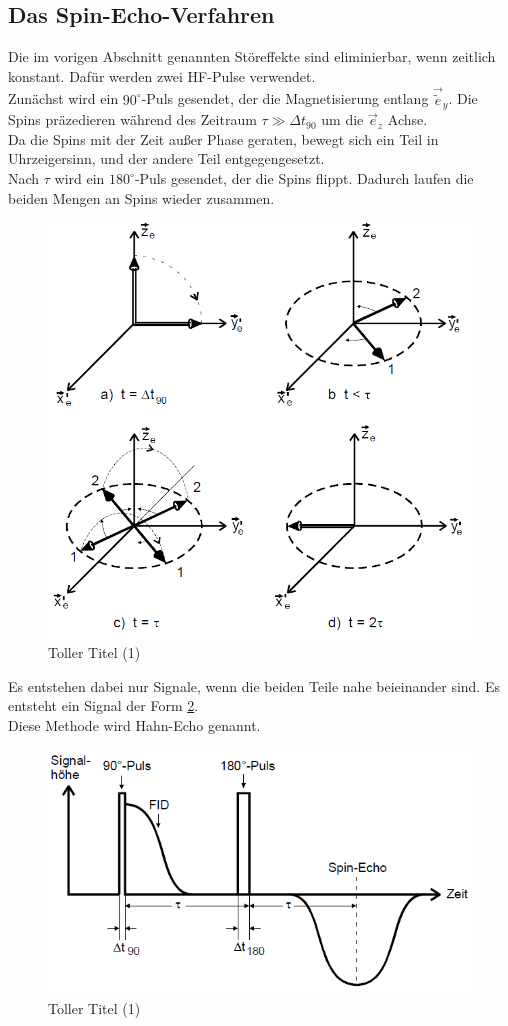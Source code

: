 \documentclass[]{scrartcl}
\begin{document}
\subsection{Das Spin-Echo-Verfahren}
Die im vorigen Abschnitt genannten Störeffekte sind eliminierbar, wenn zeitlich konstant. Dafür werden zwei HF-Pulse verwendet.\\
Zunächst wird ein $90^\circ$-Puls gesendet, der die Magnetisierung entlang $\vec{\tilde{e}}_y$. Die Spins präzedieren während des Zeitraum $\tau \gg \Delta t_{90}$ um die $\vec{e}_z$ Achse.\\
Da die Spins mit der Zeit außer Phase geraten, bewegt sich ein Teil in Uhrzeigersinn, und der andere Teil entgegengesetzt.\\
Nach $\tau$ wird ein $180^\circ$-Puls gesendet, der die Spins flippt. Dadurch laufen die beiden Mengen an Spins wieder zusammen.
\begin{figure}[H]
\centering
\includegraphics[width=12cm]{images/spin_echo.png}
\caption{Toller Titel (1)}
\label{fig::spin_echo}
\end{figure}
Es entstehen dabei nur Signale, wenn die beiden Teile nahe beieinander sind. Es entsteht ein Signal der Form \ref{fig::hahn_echo_verlauf}.\\
Diese Methode wird Hahn-Echo genannt.
\begin{figure}[H]
\centering
\includegraphics[width=12cm]{images/hahn_echo.png}
\caption{Toller Titel (1)}
\label{fig::hahn_echo_verlauf}
\end{figure}
\end{document}
